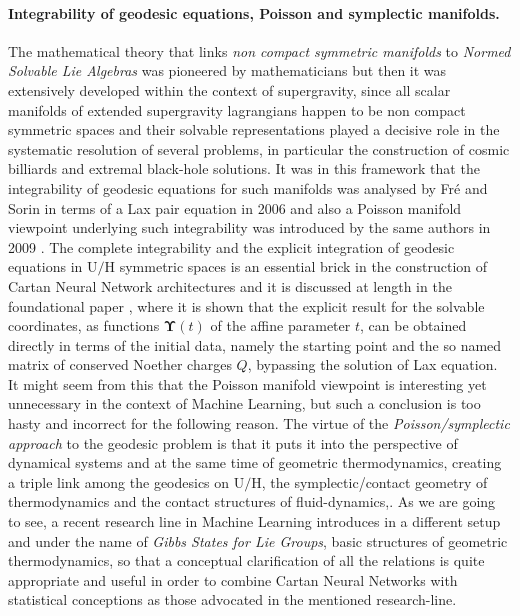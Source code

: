 \documentclass[10pt,a4paper]{article}
\begin{document}
\paragraph{Integrability of geodesic equations, Poisson and symplectic manifolds.}
The mathematical theory that links \textit{non compact symmetric manifolds} to \textit{Normed Solvable Lie Algebras} was pioneered by mathematicians but then it was extensively developed within the context of supergravity, since all scalar manifolds of extended supergravity lagrangians happen
to be non compact symmetric spaces and their solvable representations played a decisive role in the systematic resolution of several problems, in particular the construction of cosmic billiards and extremal black-hole solutions. It was in this framework that the integrability of geodesic
equations for such manifolds was analysed by Fr\'e and Sorin in terms of a Lax pair equation \cite{sashaebog} in 2006 and also a Poisson manifold viewpoint underlying such integrability was introduced by the same authors in 2009 \cite{dualborel}. The complete integrability and the explicit integration of geodesic equations in $\mathrm{U/H}$ symmetric spaces is an essential brick in the construction of Cartan Neural Network architectures
and it is discussed at length in the foundational paper \cite{pgtstheory}, where it is shown that the explicit result for the solvable coordinates, as functions $\boldsymbol{\Upsilon}(t)$ of the affine parameter $t$, can be obtained directly in terms of the initial data, namely the starting point and the so named matrix of conserved Noether charges $Q$, bypassing the solution of Lax equation. It might seem from this that the Poisson manifold viewpoint \cite{dualborel} is interesting yet unnecessary in the context of Machine Learning, but such a conclusion is too hasty and incorrect for the following reason. The virtue of the \textit{Poisson/symplectic approach} to the geodesic problem is that it puts it into the perspective of dynamical systems and at the same time of geometric thermodynamics, creating a triple link among the geodesics on $\mathrm{U/H}$, the symplectic/contact geometry of thermodynamics and the contact structures of fluid-dynamics\cite{Fre:2015mla},\cite{mariopietroinpress}. As we are going to see, a recent research line in Machine Learning introduces in a different  setup and under the name of \textit{Gibbs States for Lie Groups}, basic structures of geometric thermodynamics, so that a conceptual clarification of
all the relations is quite appropriate and useful in order to combine Cartan Neural Networks with  statistical conceptions as those advocated in the mentioned research-line.
\end{document}
